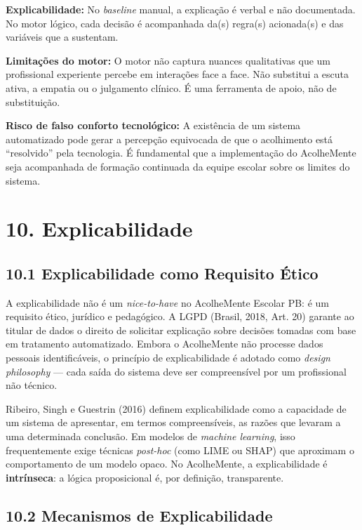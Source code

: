 \documentclass[11pt]{article}
\begin{document}
\textbf{Explicabilidade:} No \emph{baseline} manual, a explicação é
verbal e não documentada. No motor lógico, cada decisão é acompanhada
da(s) regra(s) acionada(s) e das variáveis que a sustentam.

\textbf{Limitações do motor:} O motor não captura nuances qualitativas
que um profissional experiente percebe em interações face a face. Não
substitui a escuta ativa, a empatia ou o julgamento clínico. É uma
ferramenta de apoio, não de substituição.

\textbf{Risco de falso conforto tecnológico:} A existência de um sistema
automatizado pode gerar a percepção equivocada de que o acolhimento está
``resolvido'' pela tecnologia. É fundamental que a implementação do
AcolheMente seja acompanhada de formação continuada da equipe escolar
sobre os limites do sistema.

    \section{10. Explicabilidade}\label{explicabilidade}

\subsection{10.1 Explicabilidade como Requisito
Ético}\label{explicabilidade-como-requisito-uxe9tico}

A explicabilidade não é um \emph{nice-to-have} no AcolheMente Escolar
PB: é um requisito ético, jurídico e pedagógico. A LGPD (Brasil, 2018,
Art. 20) garante ao titular de dados o direito de solicitar explicação
sobre decisões tomadas com base em tratamento automatizado. Embora o
AcolheMente não processe dados pessoais identificáveis, o princípio de
explicabilidade é adotado como \emph{design philosophy} --- cada saída
do sistema deve ser compreensível por um profissional não técnico.

Ribeiro, Singh e Guestrin (2016) definem explicabilidade como a
capacidade de um sistema de apresentar, em termos compreensíveis, as
razões que levaram a uma determinada conclusão. Em modelos de
\emph{machine learning}, isso frequentemente exige técnicas
\emph{post-hoc} (como LIME ou SHAP) que aproximam o comportamento de um
modelo opaco. No AcolheMente, a explicabilidade é \textbf{intrínseca}: a
lógica proposicional é, por definição, transparente.

\subsection{10.2 Mecanismos de
Explicabilidade}\label{mecanismos-de-explicabilidade}
\end{document}
